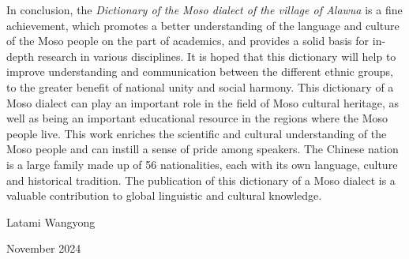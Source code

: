 In conclusion, the \emph{Dictionary of the Moso dialect of the village of Alawua} is a fine achievement, which promotes a better understanding of the language and culture of the Moso people on the part of academics, and provides a solid basis for in-depth research in various disciplines. It is hoped that this dictionary will help to improve understanding and communication between the different ethnic groups, to the greater benefit of national unity and social harmony. This dictionary of a Moso dialect can play an important role in the field of Moso cultural heritage, as well as being an important educational resource in the regions where the Moso people live. This work enriches the scientific and cultural understanding of the Moso people and can instill a sense of pride among speakers. The Chinese nation is a large family made up of 56 nationalities, each with its own language, culture and historical tradition. The publication of this dictionary of a Moso dialect is a valuable contribution to global linguistic and cultural knowledge.

{\raggedleft Latami Wangyong \par}

{\raggedleft November 2024\par}
